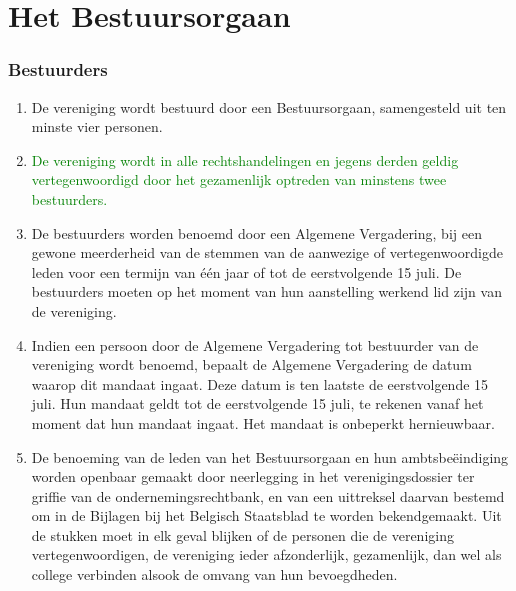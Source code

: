 \part{Het Bestuursorgaan}

    \section{Bestuurders}
    \begin{enumerate}
    \item De vereniging wordt bestuurd door een Bestuursorgaan, samengesteld uit ten minste vier personen. 
    \item \textcolor{green}{De vereniging wordt in alle rechtshandelingen en jegens derden geldig vertegenwoordigd door het gezamenlijk optreden van minstens twee bestuurders.}
    \item De bestuurders worden benoemd door een Algemene Vergadering, bij een gewone meerderheid van de stemmen van de aanwezige of vertegenwoordigde leden voor een termijn van één jaar of tot de eerstvolgende 15 juli. De bestuurders moeten op het moment van hun aanstelling werkend lid zijn van de vereniging.
    \item Indien een persoon door de Algemene Vergadering tot bestuurder van de vereniging wordt benoemd, bepaalt de Algemene Vergadering de datum waarop dit mandaat ingaat. Deze datum is ten laatste de eerstvolgende 15 juli. Hun mandaat geldt tot de eerstvolgende 15 juli, te rekenen vanaf het moment dat hun mandaat ingaat. Het mandaat is onbeperkt hernieuwbaar.
    \item De benoeming van de leden van het Bestuursorgaan en hun ambtsbeëindiging worden openbaar gemaakt door neerlegging in het verenigingsdossier ter griffie van de ondernemingsrechtbank, en van een uittreksel daarvan bestemd om in de Bijlagen bij het Belgisch Staatsblad te worden bekendgemaakt. Uit de stukken moet in elk geval blijken of de personen die de vereniging vertegenwoordigen, de vereniging ieder afzonderlijk, gezamenlijk, dan wel als college verbinden alsook de omvang van hun bevoegdheden.
    \end{enumerate}
    
